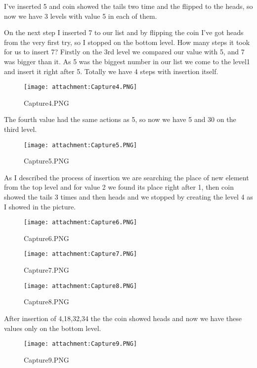 \documentclass[11pt]{article}
\makeatletter
\def\maxwidth{\ifdim\Gin@nat@width>\linewidth\linewidth
    \else\Gin@nat@width\fi}
\let\Oldincludegraphics\includegraphics
\renewcommand{\includegraphics}[1]{\Oldincludegraphics[width=.8\maxwidth]{#1}}
\makeatother
\begin{document}
    

    I've inserted 5 and coin showed the tails two time and the flipped to
the heads, so now we have 3 levels with value 5 in each of them.

    

    On the next step I inserted 7 to our list and by flipping the coin I've
got heads from the very first try, so I stopped on the bottom level. How
many steps it took for us to insert 7? Firstly on the 3rd level we
compared our value with 5, and 7 was bigger than it. As 5 was the
biggest number in our list we come to the level1 and insert it right
after 5. Totally we have 4 steps with insertion itself.

    \begin{figure}
\centering
\texttt{[image: attachment:Capture4.PNG]}
\caption{Capture4.PNG}
\end{figure}

    The fourth value had the same actions as 5, so now we have 5 and 30 on
the third level.

    \begin{figure}
\centering
\texttt{[image: attachment:Capture5.PNG]}
\caption{Capture5.PNG}
\end{figure}

    As I described the process of insertion we are searching the place of
new element from the top level and for value 2 we found its place right
after 1, then coin showed the tails 3 times and then heads and we
stopped by creating the level 4 as I showed in the picture.

    \begin{figure}
\centering
\texttt{[image: attachment:Capture6.PNG]}
\caption{Capture6.PNG}
\end{figure}

    \begin{figure}
\centering
\texttt{[image: attachment:Capture7.PNG]}
\caption{Capture7.PNG}
\end{figure}

    \begin{figure}
\centering
\texttt{[image: attachment:Capture8.PNG]}
\caption{Capture8.PNG}
\end{figure}

    After insertion of 4,18,32,34 the the coin showed heads and now we have
these values only on the bottom level.

    \begin{figure}
\centering
\texttt{[image: attachment:Capture9.PNG]}
\caption{Capture9.PNG}
\end{figure}
\end{document}

